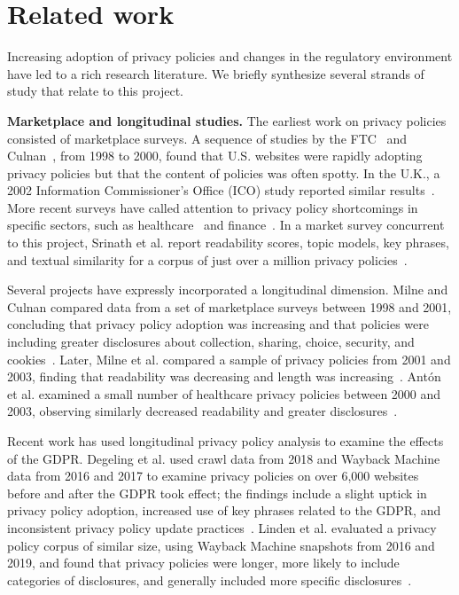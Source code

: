 \section{Related work}
\label{sec:ppot:related}

Increasing adoption of privacy policies and changes in the regulatory environment have led to a rich research literature. We briefly synthesize several strands of study that relate to this project.

\textbf{Marketplace and longitudinal studies.}
The earliest work on privacy policies consisted of marketplace surveys. A sequence of studies by the FTC~\cite{ftc-privacy-survey1998, ftc-privacy-survey2000} and Culnan~\cite{culnan2000protecting}, from 1998 to 2000, found that U.S. websites were rapidly adopting privacy policies but that the content of policies was often spotty. In the U.K., a 2002 Information Commissioner's Office (ICO) study reported similar results~\cite{ico-survey2002}. More recent surveys have called attention to privacy policy shortcomings in specific sectors, such as healthcare~\cite{sunyaev15} and finance~\cite{bowers2017}. In a market survey concurrent to this project, Srinath et al. report readability scores, topic models, key phrases, and textual similarity for a corpus of just over a million privacy policies~\cite{srinath2020}.

Several projects have expressly incorporated a longitudinal dimension. Milne and Culnan compared data from a set of marketplace surveys between 1998 and 2001, concluding that privacy policy adoption was increasing and that policies were including greater disclosures about collection, sharing, choice, security, and cookies~\cite{milne2002}. Later, Milne et al. compared a sample of privacy policies from 2001 and 2003, finding that readability was decreasing and length was increasing~\cite{milne2006longitudinal}. Antón et al. examined a small number of healthcare privacy policies between 2000 and 2003, observing similarly decreased readability and greater disclosures~\cite{anton2007hipaa}.

Recent work has used longitudinal privacy policy analysis to examine the effects of the GDPR. Degeling et al. used crawl data from 2018 and Wayback Machine data from 2016 and 2017 to examine privacy policies on over 6,000 websites before and after the GDPR took effect; the findings include a slight uptick in privacy policy adoption, increased use of key phrases related to the GDPR, and inconsistent privacy policy update practices~\cite{degeling2018we}. Linden et al. evaluated a privacy policy corpus of similar size, using Wayback Machine snapshots from 2016 and 2019, and found that privacy policies were longer, more likely to include categories of disclosures, and generally included more specific disclosures~\cite{linden2020privacy}.

